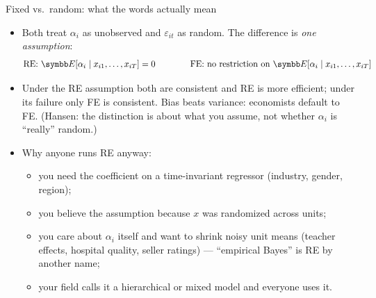 \documentclass[aspectratio=169,11pt]{beamer}
\begin{document}
\begin{frame}{Fixed vs.\ random: what the words actually mean}
\begin{itemize}
	\item Both treat $\alpha_i$ as unobserved and $\varepsilon_{it}$ as random. The difference is
	\emph{one assumption}:
	\begin{align*}
		\text{RE: } \E[\alpha_i \mid x_{i1},\dots,x_{iT}] = 0 \qquad\qquad
		\text{FE: no restriction on } \E[\alpha_i \mid x_{i1},\dots,x_{iT}]
	\end{align*}
	\medskip
	\item Under the RE assumption both are consistent and RE is more efficient; under its failure
	only FE is consistent. Bias beats variance: economists default to FE. (Hansen: the distinction
	is about what you assume, not whether $\alpha_i$ is ``really'' random.)
	\medskip
	\item Why anyone runs RE anyway:
	\begin{itemize}
		\item you need the coefficient on a \alert{time-invariant} regressor (industry, gender, region);
		\item you believe the assumption because $x$ was \alert{randomized} across units;
		\item you care about $\alpha_i$ itself and want to \alert{shrink} noisy unit means
		(teacher effects, hospital quality, seller ratings) --- ``empirical Bayes'' is RE by another name;
		\item your field calls it a \alert{hierarchical} or \alert{mixed} model and everyone uses it.
	\end{itemize}
\end{itemize}
\end{frame}
\end{document}
